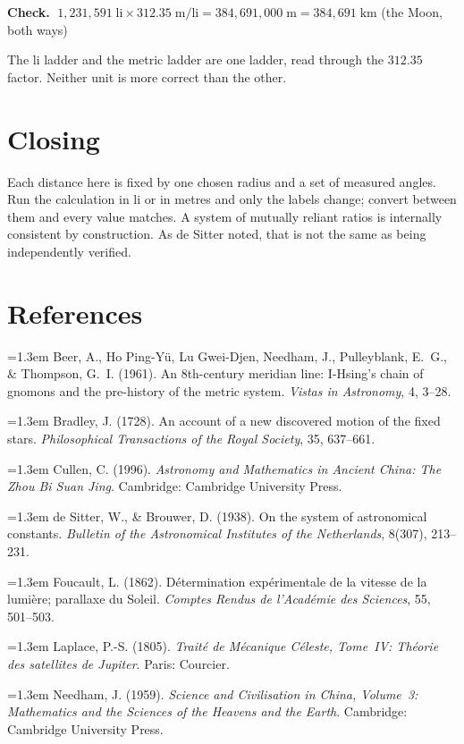 \documentclass[11pt]{article}
\begin{document}
\begin{tcolorbox}[mathbox]
\textbf{Check.} $\;1{,}231{,}591\;\text{li} \times 312.35\;\text{m/li}
 = 384{,}691{,}000\;\text{m} = 384{,}691\;\text{km}$ \quad (the Moon, both ways)
\end{tcolorbox}

\noindent
The li ladder and the metric ladder are one ladder, read through the
$312.35$ factor. Neither unit is more correct than the other.

\section*{Closing}

Each distance here is fixed by one chosen radius and a set of measured
angles. Run the calculation in li or in metres and only the labels change;
convert between them and every value matches. A system of mutually reliant
ratios is internally consistent by construction. As de Sitter noted, that is
not the same as being independently verified.

\section*{References}

{\footnotesize\setlength{\parindent}{0pt}\setlength{\parskip}{2.3pt}

\hangindent=1.3em Beer, A., Ho Ping-Y\"u, Lu Gwei-Djen, Needham, J.,
Pulleyblank, E.~G., \& Thompson, G.~I. (1961). An 8th-century meridian line:
I-Hsing's chain of gnomons and the pre-history of the metric system.
\emph{Vistas in Astronomy}, 4, 3--28.\par

\hangindent=1.3em Bradley, J. (1728). An account of a new discovered motion of
the fixed stars. \emph{Philosophical Transactions of the Royal Society}, 35,
637--661.\par

\hangindent=1.3em Cullen, C. (1996). \emph{Astronomy and Mathematics in
Ancient China: The Zhou Bi Suan Jing}. Cambridge: Cambridge University Press.\par

\hangindent=1.3em de Sitter, W., \& Brouwer, D. (1938). On the system of
astronomical constants. \emph{Bulletin of the Astronomical Institutes of the
Netherlands}, 8(307), 213--231.\par

\hangindent=1.3em Foucault, L. (1862). D\'etermination exp\'erimentale de la
vitesse de la lumi\`ere; parallaxe du Soleil. \emph{Comptes Rendus de
l'Acad\'emie des Sciences}, 55, 501--503.\par

\hangindent=1.3em Laplace, P.-S. (1805). \emph{Trait\'e de M\'ecanique
C\'eleste, Tome~IV: Th\'eorie des satellites de Jupiter}. Paris: Courcier.\par

\hangindent=1.3em Needham, J. (1959). \emph{Science and Civilisation in China,
Volume~3: Mathematics and the Sciences of the Heavens and the Earth}.
Cambridge: Cambridge University Press.\par

}
\end{document}

